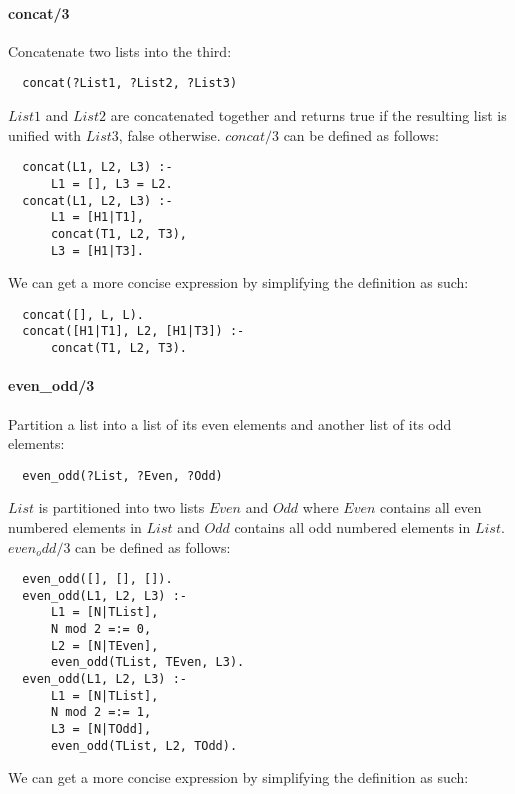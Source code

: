 \documentclass{article}
\begin{document}
\begin{multicols}{2}
  \paragraph{concat/3} Concatenate two lists into the third:
  
  \begin{lstlisting}
  concat(?List1, ?List2, ?List3)
  \end{lstlisting} 
  
  $List1$ and $List2$ are concatenated together and returns true if the resulting list is unified with $List3$, false otherwise. $concat/3$ can be defined as follows:

  \begin{lstlisting}
  concat(L1, L2, L3) :-
      L1 = [], L3 = L2.
  concat(L1, L2, L3) :- 
      L1 = [H1|T1],
      concat(T1, L2, T3),
      L3 = [H1|T3].
  \end{lstlisting} 
  
  We can get a more concise expression by simplifying the definition as such:

  \begin{lstlisting}
  concat([], L, L).
  concat([H1|T1], L2, [H1|T3]) :- 
      concat(T1, L2, T3).
  \end{lstlisting}
  
  \paragraph{even\_odd/3} Partition a list into a list of its even elements and another list of its odd elements:
  
  \begin{lstlisting}
  even_odd(?List, ?Even, ?Odd)
  \end{lstlisting} 
  
  $List$ is partitioned into two lists $Even$ and $Odd$ where $Even$ contains all even numbered elements in $List$ and $Odd$ contains all odd numbered elements in $List$. $even_odd/3$ can be defined as follows:

  \begin{lstlisting}
  even_odd([], [], []).
  even_odd(L1, L2, L3) :- 
      L1 = [N|TList],
      N mod 2 =:= 0,
	  L2 = [N|TEven],
      even_odd(TList, TEven, L3).
  even_odd(L1, L2, L3) :- 
      L1 = [N|TList],
      N mod 2 =:= 1,
	  L3 = [N|TOdd],
      even_odd(TList, L2, TOdd).
  \end{lstlisting} 
  
  We can get a more concise expression by simplifying the definition as such:


\end{multicols}
\end{document}
